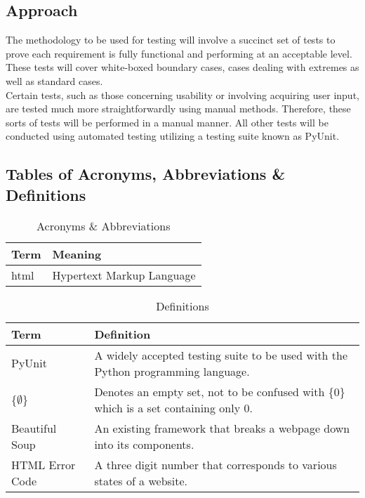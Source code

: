 \documentclass[12pt, titlepage]{article}
\begin{document}
\subsection{Approach}
The methodology to be used for testing will involve a succinct set of tests to prove each requirement is fully functional and performing at an acceptable level. These tests will cover white-boxed boundary cases, cases dealing with extremes as well as standard cases.\\

Certain tests, such as those concerning usability or involving acquiring user input, are tested much more straightforwardly using manual methods. Therefore, these sorts of tests will be performed in a manual manner. All other tests will be conducted using automated testing utilizing a testing suite known as PyUnit.

\subsection{Tables of Acronyms, Abbreviations \& Definitions}

\begin{table}[h!]
\centering
\begin{tabular}{| p{3cm} | p{10cm} |}    \hline
	Term &Meaning\\ \hline
	html & Hypertext Markup Language\\ \hline
\end{tabular}
\caption{Acronyms \& Abbreviations}
\label{table:Acronyms and Abbreviations}
\end{table}

\begin{table}[h!]
\centering
\begin{tabular}{| p{3cm} | p{10cm} |}    \hline
	Term &Definition\\ \hline
	PyUnit &A widely accepted testing suite to be used with the Python programming language.\\ \hline
	\{$\emptyset$\} &Denotes an empty set, not to be confused with \{0\} which is a set containing only 0.\\ \hline
	Beautiful Soup &An existing framework that breaks a webpage down into its components.\\ \hline
	HTML Error Code &A three digit number that corresponds to various states of a website.
\end{tabular}
\caption{Definitions}
\label{table:Definitions}
\end{table}
\end{document}
